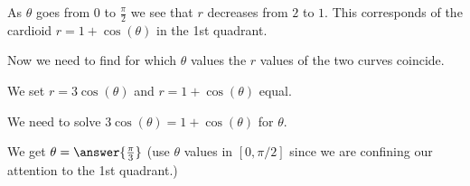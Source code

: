 \documentclass{ximera}
\begin{document}
\begin{exercise}
\begin{exercise}
\begin{hint}
\begin{image}  
\end{image} 


As $\theta$ goes from $0$ to $\frac{\pi}{2}$ we see that $r$ decreases from $2$ to $1$. This corresponds of the cardioid $r=1+\cos(\theta)$ in the 1st quadrant. 


Now we need to find for which $\theta$ values the $r$ values of the two curves coincide. 

We set $r=3\cos(\theta)$ and $r=1+\cos(\theta)$ equal. 

We need to solve $3\cos(\theta)=1+\cos(\theta)$ for $\theta$. 


We get $\theta=\answer{\frac{\pi}{3}}$ (use $\theta$ values in $[0,\pi/2]$ since we are confining our attention to the 1st quadrant.)



\end{hint}
\end{exercise}
\end{exercise}
\end{document}
